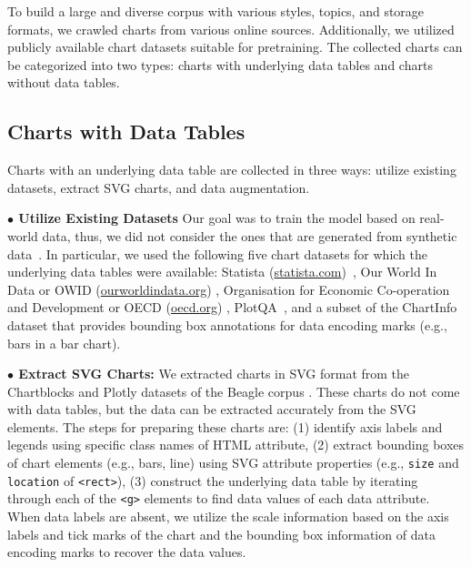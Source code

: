 To build a large and diverse corpus 
with various styles, topics, and storage formats, we crawled charts from various online sources. Additionally, we utilized publicly available chart datasets suitable for pretraining. The collected charts can be categorized into two types: charts with underlying data tables and charts without data tables.



\vspace{-1mm}
\subsection{Charts with Data Tables} \label{subsec:charts-data}


Charts with an underlying data table are collected in three ways: \Ni utilize existing datasets, \Nii extract SVG charts, and \Niii data augmentation.

\textbf{$\bullet$ Utilize Existing Datasets} Our goal was to train the model based on real-world data, thus, we did not consider the ones that are generated from synthetic data~\cite{dvqa, figureqa}. 
In particular, we used the following five chart datasets for which the underlying data tables were available: 
\Ni Statista ({\href{https://www.statista.com}{statista.com}})~\cite{chart-to-text-acl}, \Nii Our World In Data or OWID {(\href{https://ourworldindata.org}{ourworldindata.org})} \cite{masry-etal-2022-chartqa}, \Niii Organisation for Economic Co-operation and Development or OECD {(\href{https://www.oecd.org}{oecd.org})} \cite{masry-etal-2022-chartqa}, \Niv PlotQA~\cite{plotqa}, and \Nv a subset of the ChartInfo~\cite{chartinfo}  dataset that provides bounding box annotations for data encoding marks (e.g., bars in a bar chart). 

\textbf{$\bullet$ Extract SVG Charts:} We extracted charts in SVG format from the Chartblocks and Plotly datasets of the Beagle corpus \cite{battle2018beagle}. These charts do not come with data tables, but the data can be extracted accurately from the SVG elements. 
The steps for preparing these charts are: (1) identify axis labels and legends using specific class names of HTML attribute, (2) extract bounding boxes of chart elements (e.g., bars, line) using SVG attribute properties (e.g., \texttt{size} and \texttt{location} of \texttt{<rect>}), (3) construct the underlying data table by iterating through each of the \texttt{<g>} elements  to find data values of each data attribute.
When data labels are absent, we utilize the scale information based on the axis labels and tick marks 
of the chart and the bounding box information of data encoding marks to recover the data values.


